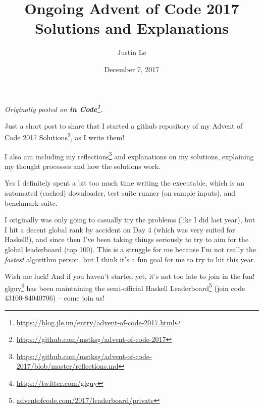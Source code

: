 \documentclass[]{article}
\title{Ongoing Advent of Code 2017 Solutions and Explanations}
\author{Justin Le}
\date{December 7, 2017}
\renewcommand{\href}[2]{#2\footnote{\url{#1}}}
\begin{document}
\maketitle

\emph{Originally posted on
\textbf{\href{https://blog.jle.im/entry/advent-of-code-2017.html}{in Code}}.}

Just a short post to share that I started a github repository of my
\href{https://github.com/mstksg/advent-of-code-2017}{Advent of Code 2017
Solutions}, as I write them!

I also am including my
\href{https://github.com/mstksg/advent-of-code-2017/blob/master/reflections.md}{reflections}
and explanations on my solutions, explaining my thought processes and how the
solutions work.

Yes I definitely spent a bit too much time writing the executable, which is an
automated (cached) downloader, test suite runner (on sample inputs), and
benchmark suite.

I originally was only going to casually try the problems (like I did last year),
but I hit a decent global rank by accident on Day 4 (which was very suited for
Haskell!), and since then I've been taking things seriously to try to aim for
the global leaderboard (top 100). This is a struggle for me because I'm not
really the \emph{fastest} algorithm person, but I think it's a fun goal for me
to try to hit this year.

Wish me luck! And if you haven't started yet, it's not too late to join in the
fun! \href{https://twitter.com/glguy}{glguy} has been maintaining the
semi-official \href{adventofcode.com/2017/leaderboard/private}{Haskell
Leaderboard} (join code 43100-84040706) -- come join us!
\end{document}
